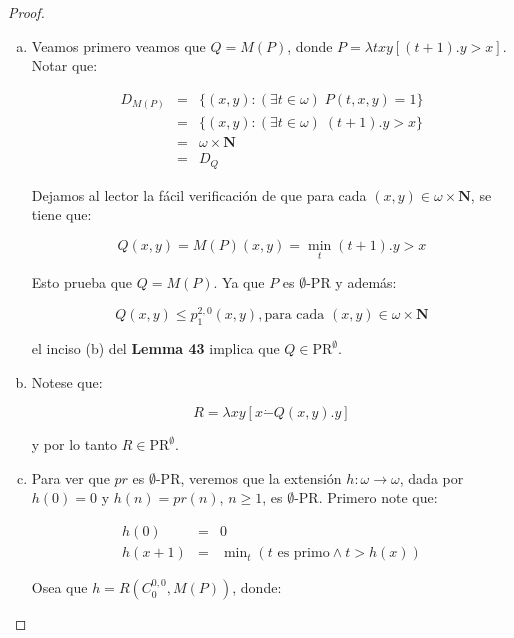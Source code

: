   \begin{proof}
    \begin{enumerate}[a)]
      \item Veamos primero veamos que $Q=M(P)$, donde $P=\lambda txy\left[(t+1).y > x\right]$. Notar que:

        \begin{eqnarray}
          \nonumber D_{M(P)} &=& \{(x,y): (\exists t \in \omega) \; P(t,x,y) = 1\} \\
          \nonumber &=& \{(x,y): (\exists t \in \omega) \; (t+1).y > x \} \\
          \nonumber &=& \omega \times \mathbf{N} \\
          \nonumber &=& D_{Q}
        \end{eqnarray}

        \par Dejamos al lector la fácil verificación de que para cada $(x,y) \in \omega \times \mathbf{N}$, se tiene que:

        \[
          Q(x,y) = M(P)(x,y) = \min_{t}(t+1).y > x
        \]

        \par Esto prueba que $Q=M(P)$. Ya que $P$ es $\emptyset$-PR y además:

        \[
          Q(x,y) \leq p_{1}^{2,0}(x,y), \text{para cada }(x,y) \in \omega \times \mathbf{N}
        \]

        \par el inciso (b) del \textbf{Lemma 43} implica que $Q \in \mathrm{PR}^{\emptyset}$.
      \item Notese que:

        \[
          R = \lambda xy\left[x \dot{-} Q(x,y).y\right]
        \]

        \par y por lo tanto $R \in \mathrm{PR}^{\emptyset}$.
      \item Para ver que $pr$ es $\emptyset$-PR, veremos que la extensión $ h: \omega \rightarrow \omega$, dada por
        $h(0)=0$ y $h(n)=pr(n)$, $n \geq 1$, es $\emptyset$-PR. Primero note que:

        \begin{eqnarray}
          \nonumber h(0) &=& 0 \\
          \nonumber h(x+1) &=& \min\nolimits_{t}\left(t \text{ es primo} \wedge t > h(x)\right)
        \end{eqnarray}

        \par Osea que $h = R \left(C_{0}^{0,0},M(P)\right)$, donde:


\end{enumerate}
\end{proof}
